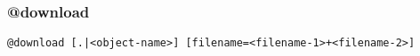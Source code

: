 \subsubsection{@download}
\label{download}

\begin{verbatim}
@download [.|<object-name>] [filename=<filename-1>+<filename-2>]
\end{verbatim}